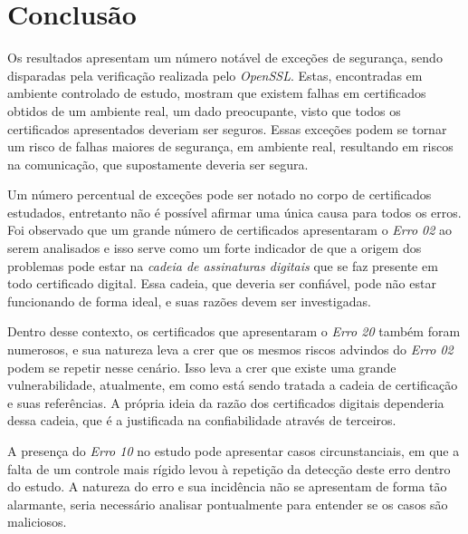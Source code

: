 

\chapter[Conclusão]{Conclusão}

	Os resultados apresentam um número notável de exceções de segurança, sendo disparadas pela verificação realizada pelo \textit{OpenSSL}. Estas, encontradas em ambiente controlado de estudo, mostram que existem falhas em certificados obtidos de um ambiente real, um dado preocupante, visto que todos os certificados apresentados deveriam ser seguros. Essas exceções podem se tornar um risco de falhas maiores de segurança, em ambiente real, resultando em riscos na comunicação, que supostamente deveria ser segura.

	Um número percentual de exceções pode ser notado no corpo de certificados estudados, entretanto não é possível afirmar uma única causa para todos os erros. Foi observado que um grande número de certificados apresentaram o \textit{Erro 02} ao serem analisados e isso serve como um forte indicador de que a origem dos problemas pode estar na \textit{cadeia de assinaturas digitais} que se faz presente em todo certificado digital. Essa cadeia, que deveria ser confiável, pode não estar funcionando de forma ideal, e suas razões devem ser investigadas.

	Dentro desse contexto, os certificados que apresentaram o \textit{Erro 20} também foram numerosos, e sua natureza leva a crer que os mesmos riscos advindos do \textit{Erro 02} podem se repetir nesse cenário. Isso leva a crer que existe uma grande vulnerabilidade, atualmente, em como está sendo tratada a cadeia de certificação e suas referências. A própria ideia da razão dos certificados digitais dependeria dessa cadeia, que é a justificada na confiabilidade através de terceiros.

	A presença do \textit{Erro 10} no estudo pode apresentar casos circunstanciais, em que a falta de um controle mais rígido levou à repetição da detecção deste erro dentro do estudo. A natureza do erro e sua incidência não se apresentam de forma tão alarmante, seria necessário analisar pontualmente para entender se os casos são maliciosos.


